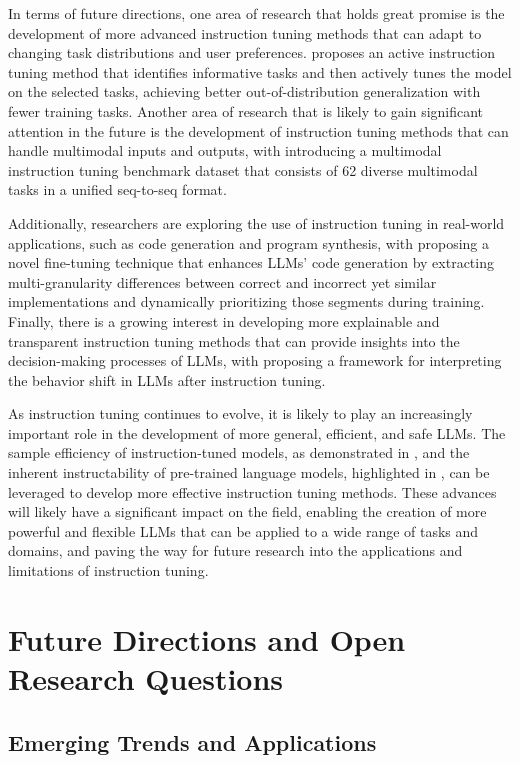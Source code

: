\documentclass[11pt]{article}
\begin{document}
In terms of future directions, one area of research that holds great promise is the development of more advanced instruction tuning methods that can adapt to changing task distributions and user preferences. \cite{ref132} proposes an active instruction tuning method that identifies informative tasks and then actively tunes the model on the selected tasks, achieving better out-of-distribution generalization with fewer training tasks. Another area of research that is likely to gain significant attention in the future is the development of instruction tuning methods that can handle multimodal inputs and outputs, with \cite{ref133} introducing a multimodal instruction tuning benchmark dataset that consists of 62 diverse multimodal tasks in a unified seq-to-seq format.

Additionally, researchers are exploring the use of instruction tuning in real-world applications, such as code generation and program synthesis, with \cite{ref134} proposing a novel fine-tuning technique that enhances LLMs' code generation by extracting multi-granularity differences between correct and incorrect yet similar implementations and dynamically prioritizing those segments during training. Finally, there is a growing interest in developing more explainable and transparent instruction tuning methods that can provide insights into the decision-making processes of LLMs, with \cite{ref2} proposing a framework for interpreting the behavior shift in LLMs after instruction tuning.

As instruction tuning continues to evolve, it is likely to play an increasingly important role in the development of more general, efficient, and safe LLMs. The sample efficiency of instruction-tuned models, as demonstrated in \cite{ref19}, and the inherent instructability of pre-trained language models, highlighted in \cite{ref29}, can be leveraged to develop more effective instruction tuning methods. These advances will likely have a significant impact on the field, enabling the creation of more powerful and flexible LLMs that can be applied to a wide range of tasks and domains, and paving the way for future research into the applications and limitations of instruction tuning.

\section{Future Directions and Open Research Questions}

\subsection{Emerging Trends and Applications}
\end{document}
